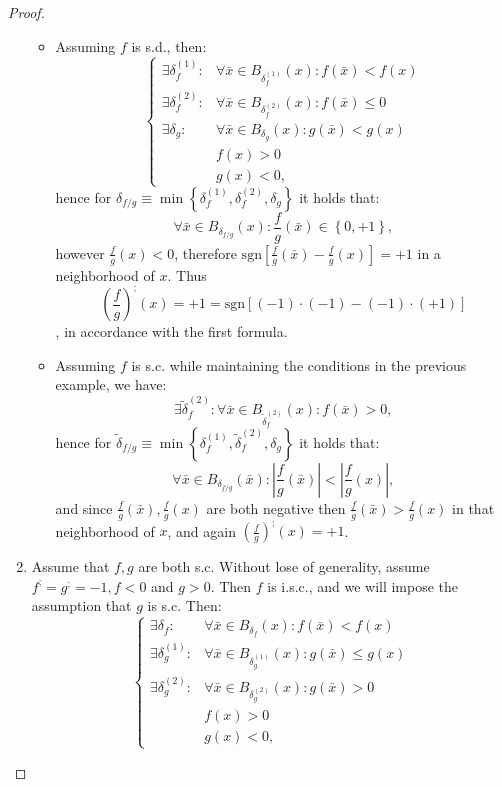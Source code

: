 \documentclass[11pt]{book}
\begin{document}
\begin{proof}
\begin{enumerate}
\begin{itemize}
\item Assuming $f$ is s.d., then:$$\begin{cases}\exists\delta_{f}^{\left(1\right)}: & \forall\bar{x}\in B_{\delta_{f}^{\left(1\right)}}\left(x\right):f\left(\bar{x}\right)< f\left(x\right)\\\exists\delta_{f}^{\left(2\right)}: & \forall\bar{x}\in B_{\delta_{f}^{\left(2\right)}}\left(x\right):f\left(\bar{x}\right)\leq0\\\exists\delta_{g}: & \forall\bar{x}\in B_{\delta_{g}}\left(x\right):g\left(\bar{x}\right)< g\left(x\right)\\ & f\left(x\right)>0\\& g\left(x\right)<0,\end{cases}$$
hence for $\delta_{f/g}\equiv\min\left\{ \delta_{f}^{\left(1\right)},\delta_{f}^{\left(2\right)},\delta_{g}\right\}$ it holds that:
$$\forall\bar{x}\in B_{\delta_{f/g}}\left(x\right):\frac{f}{g}\left(\bar{x}\right)\in\left\{ 0,+1\right\},$$
however $\frac{f}{g}\left(x\right)<0$, therefore $\text{sgn}\left[\frac{f}{g}\left(\bar{x}\right)-\frac{f}{g}\left(x\right)\right]=+1$ in a neighborhood of $x$. Thus $$\left(\frac{f}{g}\right)^{;}\left(x\right)=+1=\text{sgn}\left[\left(-1\right)\cdot\left(-1\right)-\left(-1\right)\cdot\left(+1\right)\right]$$, in accordance with the first formula.
\item Assuming $f$ is s.c. while maintaining the conditions in the previous example, we have: $$\exists\tilde{\delta}_{f}^{\left(2\right)}:\forall\bar{x}\in B_{\tilde{\delta}_{f}^{\left(2\right)}}\left(x\right):f\left(\bar{x}\right)>0,$$
hence for $\tilde{\delta}{}_{f/g}\equiv\min\left\{ \delta_{f}^{\left(1\right)},\tilde{\delta}_{f}^{\left(2\right)},\delta_{g}\right\}$ it holds that:$$\forall\bar{x}\in B_{\delta_{f/g}}\left(\bar{x}\right):\left|\frac{f}{g}\left(\bar{x}\right)\right|<\left|\frac{f}{g}\left(x\right)\right|,$$ and since $\frac{f}{g}\left(\bar{x}\right),\frac{f}{g}\left(x\right)$ are both negative then $\frac{f}{g}\left(\bar{x}\right)>\frac{f}{g}\left(x\right)$ in that neighborhood of $x$, and again $\left(\frac{f}{g}\right)^{;}\left(x\right)=+1$.
\end{itemize}

\item Assume that $f,g$ are both s.c. Without lose of generality, assume $f^{;}=g^{;}=-1,f<0$ and $g>0$. Then $f$ is i.s.c., and we will impose the assumption that $g$ is s.c. Then:
$$\begin{cases}\exists\delta_{f}: & \forall\bar{x}\in B_{\delta_{f}}\left(x\right):f\left(\bar{x}\right)< f\left(x\right)\\ \exists\delta_{g}^{\left(1\right)}: & \forall\bar{x}\in B_{\delta_{g}^{\left(1\right)}}\left(x\right):g\left(\bar{x}\right)\leq g\left(x\right)\\ \exists\delta_{g}^{\left(2\right)}: & \forall\bar{x}\in B_{\delta_{g}^{\left(2\right)}}\left(x\right):g\left(\bar{x}\right)>0\\& f\left(x\right)>0\\& g\left(x\right)<0, \end{cases}$$


\end{enumerate}
\end{proof}
\end{document}
